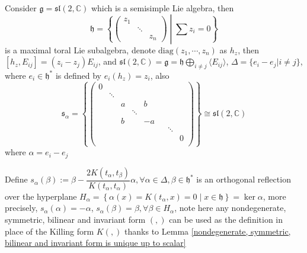 \documentclass[main]{subfiles}
\begin{document}
\begin{example}
Consider $\mathfrak{g}=\mathfrak{\mathfrak{sl}}(2,\mathbb C)$ which is a semisimple Lie algebra, then
\[\mathfrak{h}=\left\{\begin{pmatrix}
z_1 \\
&\ddots \\
&&z_n
\end{pmatrix}\middle|\textstyle\sum z_i=0\right\}\]
is a maximal toral Lie subalgebra, denote $\mathrm{diag}(z_1,\cdots,z_n)$ as $h_z$, then $[h_z,E_{ij}]=(z_i-z_j)E_{ij}$, and $\mathfrak{\mathfrak{sl}}(2,\mathbb C)=\mathfrak{g}=\mathfrak{h}\displaystyle\bigoplus_{i\neq j}\langle E_{ij}\rangle$, $\Delta=\{e_i-e_j|i\neq j\}$, where $e_i\in\mathfrak{h}^*$ is defined by $e_i(h_z)=z_i$, also
\[\mathfrak{s}_{\alpha}=\left\{\begin{pmatrix}
0 \\
&\ddots \\
&&a&&b \\
&&&\ddots \\
&&b&&-a \\
&&&&&&\ddots \\
&&&&&&&0 \\
\end{pmatrix}\right\}\cong \mathfrak{sl}(2,\mathbb C)\]
where $\alpha=e_i-e_j$
\end{example}

\begin{definition}\label{Definition of s_alpha}
Define $s_\alpha(\beta):=\beta-\dfrac{2K(t_\alpha,t_\beta)}{K(t_\alpha,t_\alpha)}\alpha,\forall\alpha\in\Delta,\beta\in\mathfrak{h}^*$ is an orthogonal reflection over the hyperplane $H_\alpha=\left\{\alpha(x)=K(t_\alpha,x)=0\middle|x\in\mathfrak{h}\right\}=\ker\alpha$, more precisely, $s_\alpha(\alpha)=-\alpha$, $s_\alpha(\beta)=\beta,\forall\beta\in H_\alpha$, note here any nondegenerate, symmetric, bilinear and invariant form $(,)$ can be used as the definition in place of the Killing form $K(,)$ thanks to Lemma \ref{nondegenerate, symmetric, bilinear and invariant form is unique up to scalar}
\end{definition}
\end{document}
